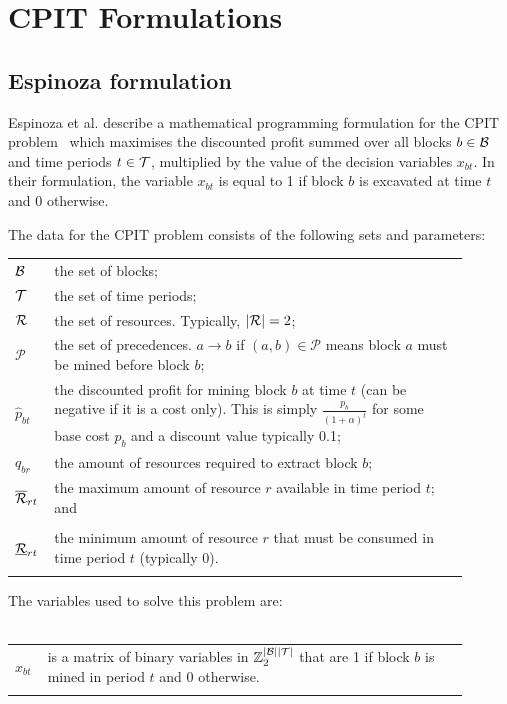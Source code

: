 \documentclass[journal]{IEEEtran}
\begin{document}
\clearpage
\appendices
\section{CPIT Formulations}\label{app:cpit}
\subsection*{Espinoza formulation}
Espinoza et al. describe a mathematical programming formulation for the CPIT problem~\cite{minelib} which maximises the discounted profit summed over all blocks $b \in \S{B}$ and time periods $t \in \S{T}$, multiplied by the value of the decision variables $x_{bt}$. In their formulation, the variable $x_{bt}$ is equal to 1 if block $b$ is excavated at time $t$ and 0 otherwise.\par 

The data for the CPIT problem consists of the following sets and parameters:

\begin{tabular}{p{0.05\linewidth}p{0.85\linewidth}}
$\S{B}$ & the set of blocks;\\
$\S{T}$ & the set of time periods;\\
$\S{R}$ & the set of resources. Typically, $|\S{R}| = 2$;\\
$\mathcal{P}$ & the set of precedences. $a \to b$ if $(a,b) \in \mathcal{P}$
                means block $a$ must be mined before block $b$;\\
$\hat{p}_{bt}$  & the discounted profit for mining block $b$ at time $t$
            (can be negative if it is a cost only). This
            is simply $\frac{p_b}{(1+\alpha)^t}$ for some base cost
            $p_b$ and a discount value typically 0.1;\\
$q_{br}$ & the amount of resources required to extract block $b$;\\
$\overline{\S{R}}_{rt}$ & the maximum amount of resource $r$ available in time period $t$; and\\\hfill\\
$\underline{\S{R}}_{rt}$ & the minimum amount of resource $r$ that must be consumed in time period $t$ (typically 0).\\\hfill\\
\end{tabular}
\par
The variables used to solve this problem are:\\\hfill\\
\begin{tabular}{p{0.05\linewidth}p{0.85\linewidth}}
$x_{bt}$ & is a matrix of binary variables in $\Bin^{|\S{B}||\S{T}|}$ that are 1 if block $b$ is mined in
                      period $t$ and 0 otherwise.\\\hfill\\
\end{tabular}
\end{document}
